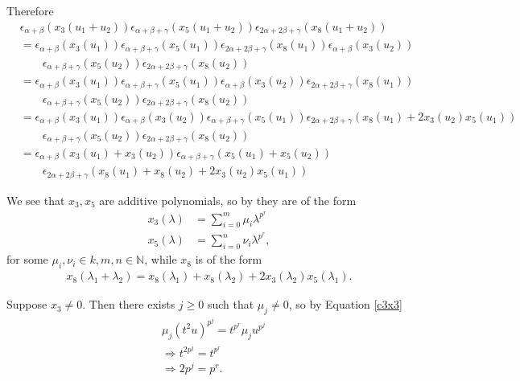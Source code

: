Therefore
\begin{align*}
&\epsilon_{\alpha+\beta}\left(x_3(u_1 + u_2)\right)
\epsilon_{\alpha+\beta+\gamma}\left(x_5(u_1 + u_2)\right)
\epsilon_{2\alpha+2\beta+\gamma}\left(x_8(u_1 + u_2)\right) \\
&=
\epsilon_{\alpha+\beta}\left(x_3(u_1)\right)
\epsilon_{\alpha+\beta+\gamma}\left(x_5(u_1)\right)
\epsilon_{2\alpha+2\beta+\gamma}\left(x_8(u_1)\right)
\epsilon_{\alpha+\beta}\left(x_3(u_2)\right) \\
&\qquad\epsilon_{\alpha+\beta+\gamma}\left(x_5(u_2)\right) 
\epsilon_{2\alpha+2\beta+\gamma}\left(x_8(u_2)\right) \\
&=
\epsilon_{\alpha+\beta}\left(x_3(u_1)\right)
\epsilon_{\alpha+\beta+\gamma}\left(x_5(u_1)\right)
\epsilon_{\alpha+\beta}\left(x_3(u_2)\right)
\epsilon_{2\alpha+2\beta+\gamma}\left(x_8(u_1)\right) \\
&\qquad\epsilon_{\alpha+\beta+\gamma}\left(x_5(u_2)\right) 
\epsilon_{2\alpha+2\beta+\gamma}\left(x_8(u_2)\right) \\
&=
\epsilon_{\alpha+\beta}\left(x_3(u_1)\right)
\epsilon_{\alpha+\beta}\left(x_3(u_2)\right)
\epsilon_{\alpha+\beta+\gamma}\left(x_5(u_1)\right)
\epsilon_{2\alpha+2\beta+\gamma}\left(x_8(u_1) + 2x_3(u_2)x_5(u_1)\right) \\
&\qquad\epsilon_{\alpha+\beta+\gamma}\left(x_5(u_2)\right) 
\epsilon_{2\alpha+2\beta+\gamma}\left(x_8(u_2)\right) \\
&=
\epsilon_{\alpha+\beta}\left(x_3(u_1) + x_3(u_2)\right)
\epsilon_{\alpha+\beta+\gamma}\left(x_5(u_1) + x_5(u_2)\right) \\
&\qquad\epsilon_{2\alpha+2\beta+\gamma}\left(x_8(u_1) + x_8(u_2) + 2x_3(u_2)x_5(u_1)\right)
\end{align*}

We see that $x_3, x_5$ are additive polynomials, so by \cite[\S 20.3, Lemma A]{humphreys1975linear} they are of the form
\begin{align*}
	x_3(\lambda) &= \sum_{i=0}^m \mu_i\lambda^{p^r} \\
	x_5(\lambda) &= \sum_{i=0}^n \nu_i\lambda^{p^r},
\end{align*}
for some $\mu_i, \nu_i \in k, m,n \in \mathbb{N}$, while $x_8$ is of the form
\begin{align}\label{c3x8}
	x_8(\lambda_1 + \lambda_2) = x_8(\lambda_1) + x_8(\lambda_2) + 2x_3(\lambda_2)x_5(\lambda_1).
\end{align}

Suppose $x_3 \neq 0$. Then there exists $j \geq 0$ such that $\mu_j \neq 0$, so by Equation \ref{c3x3}
\begin{align*}
	&\mu_j(t^2u)^{p^j} = t^{p^r}\mu_ju^{p^j} \\
	&\Rightarrow t^{2p^j} = t^{p^r} \\
	&\Rightarrow 2p^j = p^r.
\end{align*}

